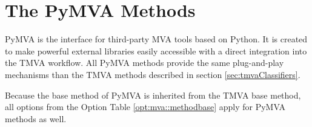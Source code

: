 \section{The PyMVA Methods}
\label{sec:pymvaClassifiers}

PyMVA is the interface for third-party MVA tools based on Python. It is created to make powerful external libraries easily accessible with a direct integration into the TMVA workflow. All PyMVA methods provide the same plug-and-play mechanisms than the TMVA methods described in section \ref{sec:tmvaClassifiers}.

Because the base method of PyMVA is inherited from the TMVA base method, all options from the Option Table \ref{opt:mva::methodbase} apply for PyMVA methods as well.
